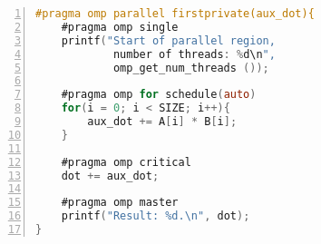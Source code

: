 \begin{lstlisting}[language=C, basicstyle=\ttfamily\scriptsize, numbers=left,
                   frame=no, showspaces=false, showstringspaces=false,
                   caption={\textit{OpenMP} Sample Program}, captionpos=b,
                   numberstyle=\tiny,
                   xleftmargin=0.6cm,
                   label=lst:listing-omp, keywords={%
                       \#pragma,
                       omp, parallel, firstprivate,
                       single, omp_get_num_threads,
                       for, schedule, auto,
                       critical, master,
                       NULL, int, main,
                       void, printf, return%
                   },
                   otherkeywords={::, \#pragma, \#include, <<<,>>>, \&, \*, +, -, /, [, ], >, <}
                       ]
#pragma omp parallel firstprivate(aux_dot){
    #pragma omp single
    printf("Start of parallel region,
            number of threads: %d\n",
            omp_get_num_threads ());

    #pragma omp for schedule(auto)
    for(i = 0; i < SIZE; i++){
        aux_dot += A[i] * B[i];
    }

    #pragma omp critical
    dot += aux_dot;

    #pragma omp master
    printf("Result: %d.\n", dot);
}
\end{lstlisting}
